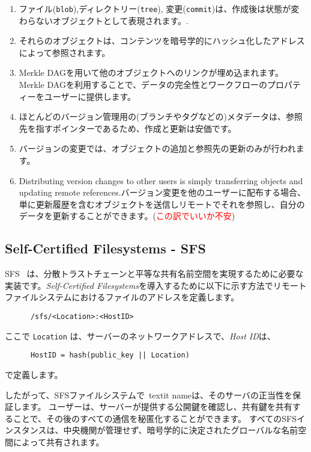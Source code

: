 \documentclass{sig-alternate}
\begin{document}
\begin{enumerate}
  \item ファイル(\texttt{blob}),ディレクトリー(\texttt{tree}), 変更(\texttt{commit})は、作成後は状態が変わらないオブジェクトとして表現されます。.
  \item それらのオブジェクトは、コンテンツを暗号学的にハッシュ化したアドレスによって参照されます。
  \item Merkle DAGを用いて他のオブジェクトへのリンクが埋め込まれます。Merkle DAGを利用することで、データの完全性とワークフローのプロパティーをユーザーに提供します。
  \item ほとんどのバージョン管理用の(ブランチやタグなどの)メタデータは、参照先を指すポインターであるため、作成と更新は安価です。
  \item バージョンの変更では、オブジェクトの追加と参照先の更新のみが行われます。
  \item Distributing version changes to other users is simply transferring objects and updating remote references.バージョン変更を他のユーザーに配布する場合、単に更新履歴を含むオブジェクトを送信しリモートでそれを参照し、自分のデータを更新することができます。(\textcolor{red}{この訳でいいか不安})
\end{enumerate}

\subsection{Self-Certified Filesystems - SFS}

SFS~\cite{mazieres98, mazieres00} は、分散トラストチェーンと平等な共有名前空間を実現するために必要な実装です。\textit{Self-Certified Filesystems}を導入するために以下に示す方法でリモートファイルシステムにおけるファイルのアドレスを定義します。
\begin{verbatim}
      /sfs/<Location>:<HostID>
\end{verbatim}

\noindent ここで \texttt{Location} は、サーバーのネットワークアドレスで、\textit{Host ID}は、

\begin{verbatim}
      HostID = hash(public_key || Location)
\end{verbatim}

で定義します。

したがって、SFSファイルシステムで\ textit {name}は、そのサーバの正当性を保証します。 ユーザーは、サーバーが提供する公開鍵を確認し、共有鍵を共有することで、その後のすべての通信を秘匿化することができます。 すべてのSFSインスタンスは、中央機関が管理せず、暗号学的に決定されたグローバルな名前空間によって共有されます。
\end{document}
